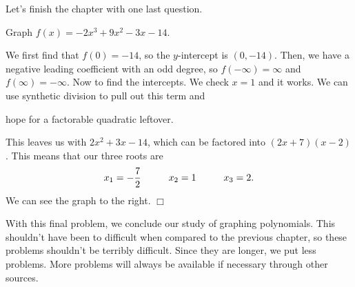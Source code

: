 \documentclass[../book.tex]{subfiles}
\begin{document}
Let's finish the chapter with one last question.
\begin{example}
Graph $f(x)=-2x^3+9x^2-3x-14$.
\end{example}
\begin{solution}
We first find that $f(0)=-14$, so the $y$-intercept is $(0,-14)$.  Then, we have a negative leading coefficient with an odd degree, so $f(-\infty)=\infty$ and $f(\infty)=-\infty$. Now to find the intercepts.  We check $x=1$ and it works.  We can use synthetic division to pull out this term and 
\end{solution}

\begin{wrapfigure}{r}{5cm}
\end{wrapfigure}

\noindent hope for a factorable quadratic leftover.


\noindent This leaves us with $2x^2+3x-14$, which can be factored into $(2x+7)(x-2)$.  This means that our three roots are $$x_1=-\dfrac{7}{2}\hspace{10mm} x_2=1\hspace{10mm} x_3=2.$$ We can see the graph to the right. $\Box$

With this final problem, we conclude our study of graphing polynomials.  This shouldn't have been to difficult when compared to the previous chapter, so these problems shouldn't be terribly difficult.  Since they are longer, we put less problems.  More problems will always be available if necessary through other sources.
\end{document}
